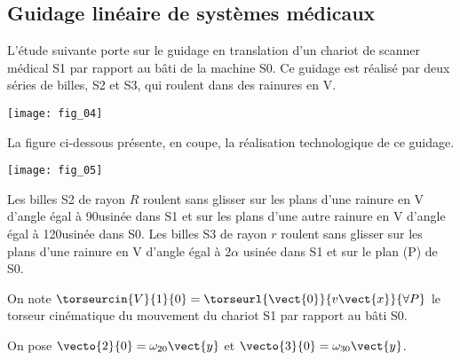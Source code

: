 \subsection*{Guidage linéaire de systèmes médicaux}
\setcounter{numques}{0}


L’étude suivante porte sur le guidage en translation d’un chariot 
de scanner médical S1 par rapport au bâti de la machine S0. Ce 
guidage est réalisé par deux séries de billes, S2 et S3, qui roulent 
dans des rainures en V. 

\begin{center}
\texttt{[image: fig\_04]}
\end{center}


La figure ci-dessous présente, en coupe, la réalisation technologique de ce guidage. 

\begin{center}
\texttt{[image: fig\_05]}
\end{center}

Les billes S2 de rayon $R$ roulent sans glisser sur les plans d’une rainure en V d’angle égal à 90\textdegree usinée dans 
S1 et sur les plans d’une autre rainure en V d’angle égal à 120\textdegree usinée dans S0. 
Les billes S3 de rayon $r$ roulent sans glisser sur les plans d’une rainure en V d’angle égal à 
$2\alpha$ usinée dans 
S1 et sur le plan (P) de S0. 

On note $\torseurcin{V}{1}{0}=\torseurl{\vect{0}}{v\vect{x}}{\forall P}$ le torseur cinématique du mouvement du chariot S1 par rapport au bâti S0. 

On pose $\vecto{2}{0} = \omega_{20}\vect{y}$ et $\vecto{3}{0} = \omega_{30}\vect{y}$.

\ifprof
\begin{corrige}
\end{corrige}\else\fi

\ifprof
\begin{corrige}
\end{corrige}\else\fi

\ifprof
\begin{corrige}
\end{corrige}\else\fi

